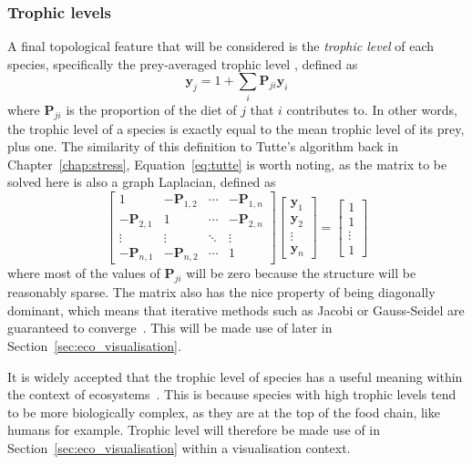 \subsubsection{Trophic levels}
A final topological feature that will be considered is the \emph{trophic level} of each species, specifically the prey-averaged trophic level \cite{Williams2004}, defined as
\begin{equation}
  \mathbf{y}_j = 1 + \sum_i \mathbf{P}_{ji}\mathbf{y}_i
  \label{eq:trophic}
\end{equation}
where $\mathbf{P}_{ji}$ is the proportion of the diet of $j$ that $i$ contributes to.
In other words, the trophic level of a species is exactly equal to the mean trophic level of its prey, plus one.
The similarity of this definition to Tutte's algorithm back in Chapter~\ref{chap:stress}, Equation~\eqref{eq:tutte} is worth noting, as the matrix to be solved here is also a graph Laplacian, defined as
\begin{equation}
  \begin{bmatrix}
  1&-\mathbf{P}_{1,2}&\cdots&-\mathbf{P}_{1,n}\\
  -\mathbf{P}_{2,1}&1&\cdots&-\mathbf{P}_{2,n}\\
  \vdots&\vdots&\ddots&\vdots\\
  -\mathbf{P}_{n,1}&-\mathbf{P}_{n,2}&\cdots&1
  \end{bmatrix}
  \begin{bmatrix}
  \mathbf{y}_1\\\mathbf{y}_2\\\vdots\\\mathbf{y}_n
  \end{bmatrix}
  =
  \begin{bmatrix}
  1\\1\\\vdots\\1
  \end{bmatrix}
  \label{eq:trophic_matrix}
\end{equation}
where most of the values of $\mathbf{P}_{ji}$ will be zero because the structure will be reasonably sparse.
The matrix also has the nice property of being diagonally dominant, which means that iterative methods such as Jacobi or Gauss-Seidel are guaranteed to converge~\cite{Young2014}. This will be made use of later in Section~\ref{sec:eco_visualisation}.

It is widely accepted that the trophic level of species has a useful meaning within the context of ecosystems~\cite{Post2002, Johnson2014}. This is because species with high trophic levels tend to be more biologically complex, as they are at the top of the food chain, like humans for example. Trophic level will therefore be made use of in Section~\ref{sec:eco_visualisation} within a visualisation context.

